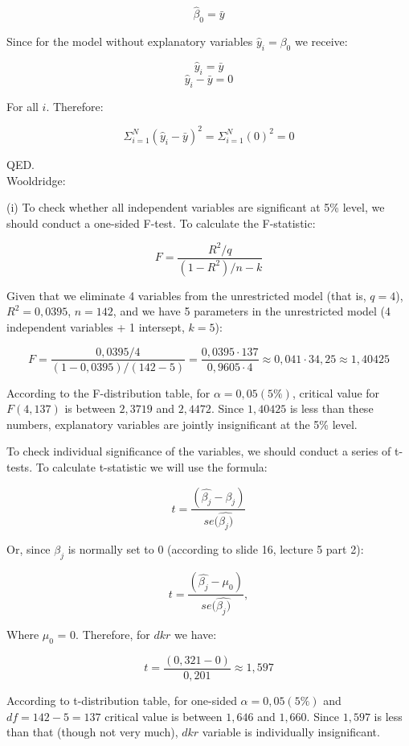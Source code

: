 \documentclass{article}
\begin{document}
$$\hat{\beta}_{0} = \bar{y}$$

Since for the model without explanatory variables $\hat{y}_i = \beta_0$ we receive:

$$\hat{y}_i = \bar{y}$$
$$\hat{y}_i - \bar{y} = 0$$

For all $i$. Therefore:

$$\Sigma^{N}_{i=1} (\hat{y}_{i} - \bar{y})^2 = \Sigma^{N}_{i=1} (0)^2 = 0$$

QED.
\\

Wooldridge:

(i) To check whether all independent variables are significant at 5\% level, we should conduct a one-sided F-test. To calculate the F-statistic:

$$F = \frac{R^2 / q}{(1 - R^2) / n-k}$$

Given that we eliminate 4 variables from the unrestricted model (that is, $q = 4$), $R^2 = 0,0395$, $n = 142$, and we have 5 parameters in the unrestricted model (4 independent variables + 1 intersept, $k = 5$):

$$F = \frac{0,0395 / 4}{(1 - 0,0395) / (142 - 5)} = \frac{0,0395 \cdot 137}{0,9605 \cdot 4} \approx 0,041 \cdot 34,25 \approx 1,40425$$

According to the F-distribution table, for $\alpha = 0,05 (5\%)$, critical value for $F(4, 137)$ is between $2,3719$ and $2,4472$. Since $1,40425$ is less than these numbers, explanatory variables are jointly insignificant at the 5\% level. 

To check individual significance of the variables, we should conduct a series of t-tests. To calculate t-statistic we will use the formula:

$$t = \frac{(\hat{\beta_{j}} - \beta_{j})}{se(\hat{\beta_{j})}}$$

Or, since $\beta_{j}$ is normally set to 0 (according to slide 16, lecture 5 part 2):

$$t = \frac{(\hat{\beta_{j}} - \mu_{0})}{se(\hat{\beta_{j})}},$$

Where $\mu_0$ = 0. Therefore, for $dkr$ we have:

$$t = \frac{(0,321 - 0)}{0,201} \approx 1,597$$

According to t-distribution table, for one-sided $\alpha = 0,05 (5\%)$ and $df = 142 - 5 = 137$ critical value is between $1,646$ and $1,660$. Since $1,597$ is less than that (though not very much), $dkr$ variable is individually insignificant.
\\
\end{document}
